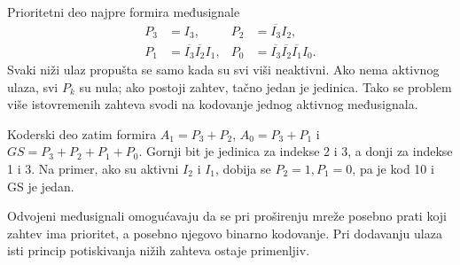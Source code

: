 
Prioritetni deo najpre formira međusignale
\[
\begin{aligned}
 P_3&=I_3, &P_2&=\overline{I_3}I_2,\\
 P_1&=\overline{I_3}\overline{I_2}I_1,
 &P_0&=\overline{I_3}\overline{I_2}\overline{I_1}I_0.
\end{aligned}
\]
Svaki niži ulaz propušta se samo kada su svi viši neaktivni. Ako nema aktivnog ulaza, svi \(P_k\) su nula; ako postoji zahtev, tačno jedan je jedinica. Tako se problem više istovremenih zahteva svodi na kodovanje jednog aktivnog međusignala.

Koderski deo zatim formira \(A_1=P_3+P_2\), \(A_0=P_3+P_1\) i \(GS=P_3+P_2+P_1+P_0\). Gornji bit je jedinica za indekse 2 i 3, a donji za indekse 1 i 3. Na primer, ako su aktivni \(I_2\) i \(I_1\), dobija se \(P_2=1,P_1=0\), pa je kod 10 i GS je jedan.

Odvojeni međusignali omogućavaju da se pri proširenju mreže posebno prati koji zahtev ima prioritet, a posebno njegovo binarno kodovanje. Pri dodavanju ulaza isti princip potiskivanja nižih zahteva ostaje primenljiv.
